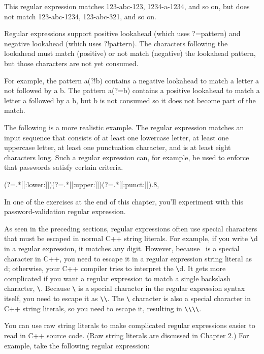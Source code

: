 This regular expression matches 123-abc-123, 1234-a-1234, and so on, but does not match 123-abc-1234, 123-abc-321, and so on.


Regular expressions support positive lookahead (which uses ?=pattern) and negative lookahead (which uses ?!pattern). The characters following the lookahead must match (positive) or not match (negative) the lookahead pattern, but those characters are not yet consumed.

For example, the pattern a(?!b) contains a negative lookahead to match a letter a not followed by a b. The pattern a(?=b) contains a positive lookahead to match a letter a followed by a b, but b is not consumed so it does not become part of the match.

The following is a more realistic example. The regular expression matches an input sequence that consists of at least one lowercase letter, at least one uppercase letter, at least one punctuation character, and is at least eight characters long. Such a regular expression can, for example, be used to enforce that passwords satisfy certain criteria.

\begin{cpp}
(?=.*[[:lower:]])(?=.*[[:upper:]])(?=.*[[:punct:]]).{8,}
\end{cpp}

In one of the exercises at the end of this chapter, you’ll experiment with this password-validation regular expression.


As seen in the preceding sections, regular expressions often use special characters that must be escaped in normal C++ string literals. For example, if you write \verb|\|d in a regular expression, it matches any digit. However, because \ is a special character in C++, you need to escape it in a regular expression string literal as \\d; otherwise, your C++ compiler tries to interpret the \verb|\|d. It gets more complicated if you want a regular expression to match a single backslash character, \verb|\|. Because \verb|\| is a special character in the regular expression syntax itself, you need to escape it as \verb|\|\verb|\|. The \verb|\| character is also a special character in C++ string literals, so you need to escape it, resulting in \verb|\|\verb|\|\verb|\|\verb|\|.

You can use raw string literals to make complicated regular expressions easier to read in C++ source code. (Raw string literals are discussed in Chapter 2.) For example, take the following regular expression:

